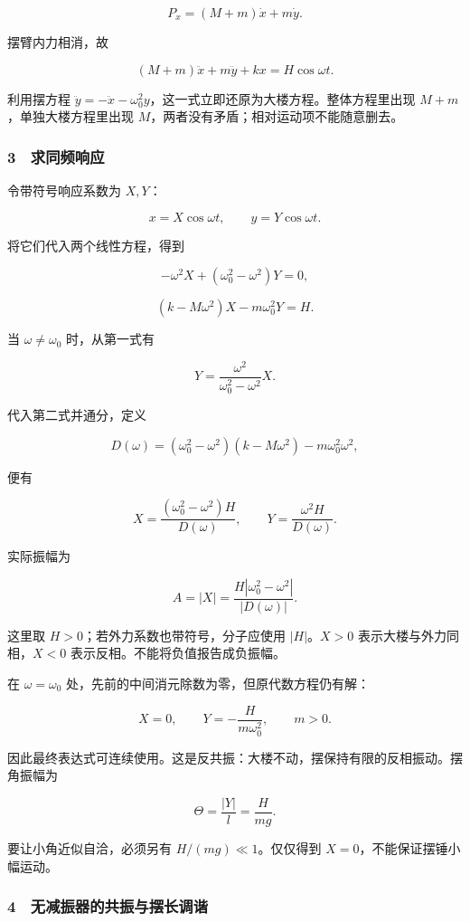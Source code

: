 \documentclass[12pt,a4paper,fontset=fandol]{ctexart}
\begin{document}
\[P_x=(M+m)\dot x+m\dot y.\]

摆臂内力相消，故

\[\boxed{(M+m)\ddot x+m\ddot y+kx=H\cos\omega t.}\]

利用摆方程
\(\ddot y=-\ddot x-\omega_0^2y\)，这一式立即还原为大楼方程。整体方程里出现
\(M+m\)，单独大楼方程里出现
\(M\)，两者没有矛盾；相对运动项不能随意删去。

\subsubsection{3　求同频响应}\label{ux6c42ux540cux9891ux54cdux5e94}

令带符号响应系数为 \(X,Y\)：

\[x=X\cos\omega t,\qquad y=Y\cos\omega t.\]

将它们代入两个线性方程，得到

\[-\omega^2X+(\omega_0^2-\omega^2)Y=0,\]

\[ (k-M\omega^2)X-m\omega_0^2Y=H.\]

当 \(\omega\ne\omega_0\) 时，从第一式有

\[Y=\frac{\omega^2}{\omega_0^2-\omega^2}X.\]

代入第二式并通分，定义

\[D(\omega)=(\omega_0^2-\omega^2)(k-M\omega^2)
-m\omega_0^2\omega^2,\]

便有

\[\boxed{X=\frac{(\omega_0^2-\omega^2)H}{D(\omega)},
\qquad Y=\frac{\omega^2H}{D(\omega)}.}\]

实际振幅为

\[\boxed{A=|X|
=\frac{H|\omega_0^2-\omega^2|}{|D(\omega)|}.}\]

这里取 \(H>0\)；若外力系数也带符号，分子应使用 \(|H|\)。\(X>0\)
表示大楼与外力同相，\(X<0\) 表示反相。不能将负值报告成负振幅。

在 \(\omega=\omega_0\) 处，先前的中间消元除数为零，但原代数方程仍有解：

\[X=0,\qquad Y=-\frac{H}{m\omega_0^2},\qquad m>0.\]

因此最终表达式可连续使用。这是反共振：大楼不动，摆保持有限的反相振动。摆角振幅为

\[\Theta=\frac{|Y|}{l}=\frac{H}{mg}.\]

要让小角近似自洽，必须另有 \(H/(mg)\ll1\)。仅仅得到
\(X=0\)，不能保证摆锤小幅运动。

\subsubsection{4　无减振器的共振与摆长调谐}\label{ux65e0ux51cfux632fux5668ux7684ux5171ux632fux4e0eux6446ux957fux8c03ux8c10}
\end{document}

